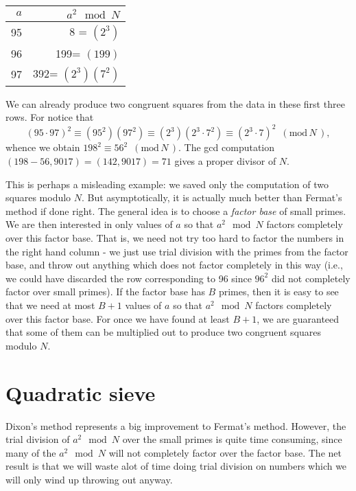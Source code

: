 \documentclass[12pt]{article}
\newcommand{\md}[1]{\,\,\, ( \mathrm{mod}\, #1 \,) }
\begin{document}
  \begin{center} \begin{tabular}{|r|r|}
    \hline
    $a$ & $a^2\mod N$ \\
    \hline
    95 & 8  = $(2^3)$\\
    96 & 199= $(199)$ \\
    97 & 392= $(2^3)(7^2)$ \\
    \hline
  \end{tabular}\end{center}

  We can already produce two congruent squares from the data in these
  first three rows. For notice that
  \[
    (95\cdot 97)^2 \equiv (95^2)(97^2) \equiv (2^3)(2^3\cdot 7^2) \equiv 
               (2^3\cdot 7)^2 \md{N},
  \]
  whence we obtain $198^2 \equiv 56^2 \md{N}$. The gcd computation
  $(198 - 56, 9017) = (142, 9017) = 71$ gives a proper divisor of $N$.
  
  This is perhaps a misleading example: we saved only the computation
  of two squares modulo $N$. But asymptotically, it is actually much
  better than Fermat's method if done right. The general idea is to 
  choose a {\em factor base} of small primes. We are then interested
  in only values of $a$ so that $a^2 \mod N$ factors completely over
  this factor base. That is, we need not try too hard to factor the
  numbers in the right hand column - we just use trial division with
  the primes from the factor base, and throw out anything which does
  not factor completely in this way (i.e., we could have discarded the
  row corresponding to 96 since $96^2$ did not completely factor over
  small primes). If the factor base has $B$ primes,
  then it is easy to see that we need at most $B+1$ values of $a$
  so that $a^2\mod N$ factors completely over this factor base. For
  once we have found at least $B+1$, we are guaranteed that some of
  them can be multiplied out to produce two congruent squares modulo $N$.
  

\section{Quadratic sieve} \label{sec:qs}
  Dixon's method represents a big improvement to Fermat's method.
  However, the trial division of $a^2\mod N$ over the small primes
  is quite time consuming, since many of the $a^2\mod N$ will not
  completely factor over the factor base. The net result is that
  we will waste alot of time doing trial division on numbers which
  we will only wind up throwing out anyway.
\end{document}
